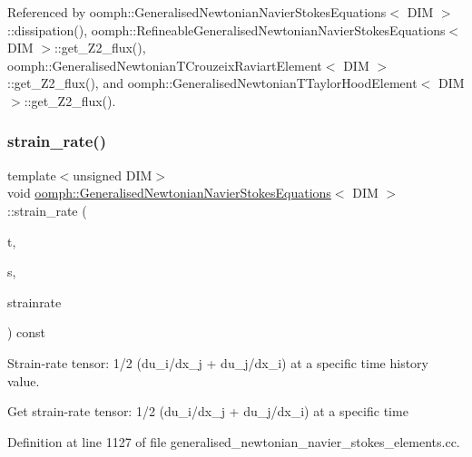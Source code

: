 Referenced by oomph\+::\+Generalised\+Newtonian\+Navier\+Stokes\+Equations$<$ D\+I\+M $>$\+::dissipation(), oomph\+::\+Refineable\+Generalised\+Newtonian\+Navier\+Stokes\+Equations$<$ D\+I\+M $>$\+::get\+\_\+\+Z2\+\_\+flux(), oomph\+::\+Generalised\+Newtonian\+T\+Crouzeix\+Raviart\+Element$<$ D\+I\+M $>$\+::get\+\_\+\+Z2\+\_\+flux(), and oomph\+::\+Generalised\+Newtonian\+T\+Taylor\+Hood\+Element$<$ D\+I\+M $>$\+::get\+\_\+\+Z2\+\_\+flux().

\mbox{\label{classoomph_1_1GeneralisedNewtonianNavierStokesEquations_a247f93de4ca4a4c5e9856fbfa7be8c48}} 
\subsubsection{\texorpdfstring{strain\+\_\+rate()}{strain\_rate()}\hspace{0.1cm}{\footnotesize\ttfamily [2/2]}}
{\footnotesize\ttfamily template$<$unsigned D\+IM$>$ \\
void \hyperlink{classoomph_1_1GeneralisedNewtonianNavierStokesEquations}{oomph\+::\+Generalised\+Newtonian\+Navier\+Stokes\+Equations}$<$ D\+IM $>$\+::strain\+\_\+rate (\begin{DoxyParamCaption}\item[{const unsigned \&}]{t,  }\item[{const \hyperlink{classoomph_1_1Vector}{Vector}$<$ double $>$ \&}]{s,  }\item[{\hyperlink{classoomph_1_1DenseMatrix}{Dense\+Matrix}$<$ double $>$ \&}]{strainrate }\end{DoxyParamCaption}) const}



Strain-\/rate tensor\+: 1/2 (du\+\_\+i/dx\+\_\+j + du\+\_\+j/dx\+\_\+i) at a specific time history value. 

Get strain-\/rate tensor\+: 1/2 (du\+\_\+i/dx\+\_\+j + du\+\_\+j/dx\+\_\+i) at a specific time 

Definition at line 1127 of file generalised\+\_\+newtonian\+\_\+navier\+\_\+stokes\+\_\+elements.\+cc.



